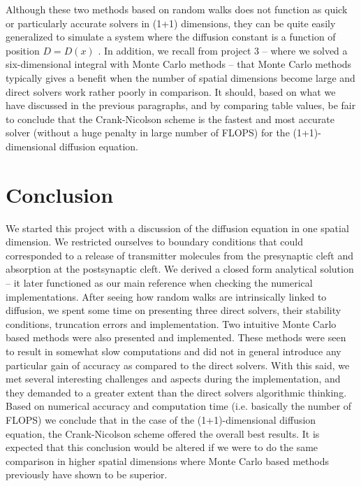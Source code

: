 \documentclass[a4paper, 11pt, notitlepage,english]{article}
\begin{document}
Although these two methods based on random walks does not function as quick or particularly accurate solvers in (1+1) dimensions, they can be quite easily generalized to simulate a system where the diffusion constant is a function of position $D = D(x)$ \cite{Farnell}. In addition, we recall from project 3 – where we solved a six-dimensional integral with Monte Carlo methods – that Monte Carlo methods typically gives a benefit when the number of spatial dimensions become large and direct solvers work rather poorly in comparison. It should, based on what we have discussed in the previous paragraphs, and by comparing table values, be fair to conclude that the Crank-Nicolson scheme is the fastest and most accurate solver (without a huge penalty in large number of FLOPS) for the (1+1)-dimensional diffusion equation.

\section{Conclusion}
We started this project with a discussion of the diffusion equation in one spatial dimension. We restricted ourselves to boundary conditions that could corresponded to a release of transmitter molecules from the presynaptic cleft and absorption at the postsynaptic cleft. We derived a closed form analytical solution – it later functioned as our main reference when checking the numerical implementations. After seeing how random walks are intrinsically linked to diffusion, we spent some time on presenting three direct solvers, their stability conditions, truncation errors and implementation. Two intuitive Monte Carlo based methods were also presented and implemented. These methods were seen to result in somewhat slow computations and did not in general introduce any particular gain of accuracy as compared to the direct solvers. With this said, we met several interesting challenges and aspects during the implementation, and they demanded to a greater extent than the direct solvers algorithmic thinking. \\

Based on numerical accuracy and computation time (i.e. basically the number of FLOPS) we conclude that in the case of the (1+1)-dimensional diffusion equation, the Crank-Nicolson scheme offered the overall best results. It is expected that this conclusion would be altered if we were to do the same comparison in higher spatial dimensions where Monte Carlo based methods previously have shown to be superior.
\end{document}
